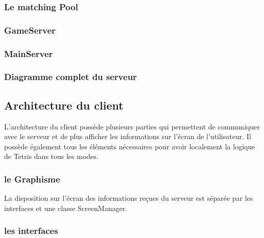 \documentclass{article}
\begin{document}
\subsubsection{Le matching Pool}

\subsubsection{GameServer}

\subsubsection{MainServer}

%

\subsubsection{Diagramme complet du serveur}

\subsection{Architecture du client}

L'architecture du client possède plusieurs parties qui permettent de communiquer avec le serveur et de plus afficher les informations sur l'écran de l'utilisateur. Il possède également tous les éléments nécessaires pour avoir localement la logique de Tetris dans tous les modes.

\subsubsection{le Graphisme}

La disposition sur l'écran des informations reçues du serveur est séparée par les interfaces et une classe ScreenManager.

\subsubsection*{les interfaces}
\end{document}
